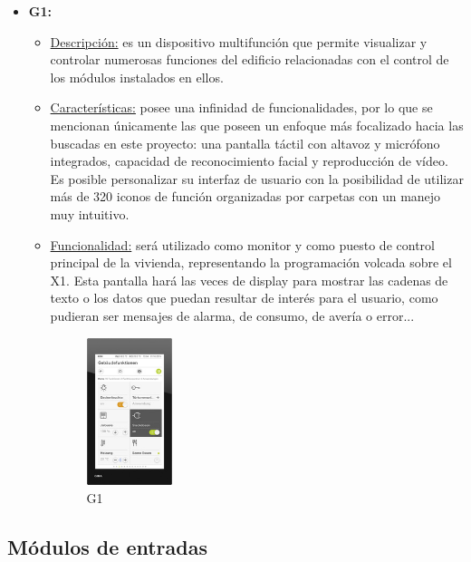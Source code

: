 \begin{itemize}
\item \textbf{G1:} 
	\begin{itemize}
	\item\underline{Descripción:} es un dispositivo multifunción que permite visualizar y controlar numerosas funciones del edificio relacionadas con el control de los módulos instalados en ellos.
	\item \underline{Características:} posee una infinidad de funcionalidades, por lo que se mencionan únicamente las que poseen un enfoque más focalizado hacia las buscadas en este proyecto: una pantalla táctil con altavoz y micrófono integrados, capacidad de reconocimiento facial y reproducción de vídeo. Es posible personalizar su interfaz de usuario con la posibilidad de utilizar más de 320 iconos de función organizadas por carpetas con un manejo muy intuitivo. 
	\item \underline{Funcionalidad:} será utilizado como monitor y como puesto de control principal de la vivienda, representando la programación volcada sobre el X1. Esta pantalla hará las veces de display para mostrar las cadenas de texto o los datos que puedan resultar de interés para el usuario, como pudieran ser mensajes de alarma, de consumo, de avería o error... 
	\begin{figure}[h]
	\centering
	\includegraphics[width=0.25\textwidth]{figures/g1.png}   
	\caption{G1}
	\label{fig:g1}
	\end{figure}
	\end{itemize} 
\end{itemize} 

\subsection{Módulos de entradas}

